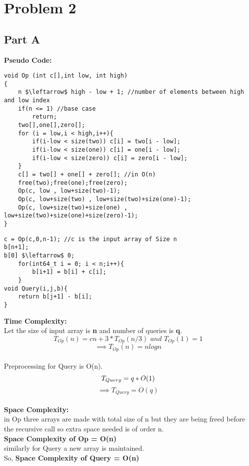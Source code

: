 \documentclass[a4paper,11pt]{article}
\theoremstyle{mytheor}
\begin{document}
\section*{Problem 2}
\subsection*{Part A}
\textbf{Pseudo Code: }
\begin{lstlisting}[label={list:first},caption=Op, mathescape = true]
void Op (int c[],int low, int high)
{
	n $\leftarrow$ high - low + 1; //number of elements between high and low index
	if(n <= 1) //base case
	    return;
    two[],one[],zero[];
    for (i = low,i < high,i++){
        if(i-low < size(two)) c[i] = two[i - low];
        if(i-low < size(one)) c[i] = one[i - low];
        if(i-low < size(zero)) c[i] = zero[i - low];
    }
    c[] = two[] + one[] + zero[]; //in O(n)
    free(two);free(one);free(zero);
    Op(c, low , low+size(two)-1);
    Op(c, low+size(two) , low+size(two)+size(one)-1);
    Op(c, low+size(two)+size(one) , low+size(two)+size(one)+size(zero)-1);
}
\end{lstlisting}
\begin{lstlisting}[label={list:first},caption=Query, mathescape = true]
c = Op(c,0,n-1); //c is the input array of Size n
b[n+1];
b[0] $\leftarrow$ 0;
	for(int64_t i = 0; i < n;i++){
		b[i+1] = b[i] + c[i];
	}
void Query(i,j,b){
    return b[j+1] - b[i];
}
\end{lstlisting}

\textbf{Time Complexity: }\\
Let the size of input array is \textbf{n} and number of queries is \textbf{q}.\\
\[T_{Op}(n) = cn + 3 * T_{Op}(n/3) \textit{\ and\ } T_{Op}(1) = 1 \]
\[\implies T_{Op}(n) = nlogn\]\\
Preprocessing for Query is O(n).\\
\[T_{Query} = q * O(1)\\\]
\[\implies T_{Query} = O(q)\]\\

\textbf{Space Complexity: }\\
in Op three arrays are made with total size of n but they are being freed before the recursive call so extra space needed is of order n.\\
\textbf{Space Complexity of Op = O(n)}\\
similarly for Query a new array is maintained.\\
So, \textbf{Space Complexity of Query = O(n)}\\
\end{document}
